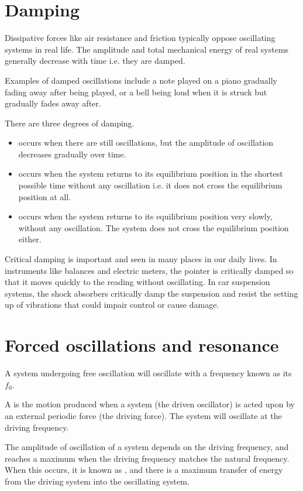 \documentclass[Physics.tex]{subfiles}
\begin{document}
\section{Damping}
Dissipative forces like air resistance and friction typically oppose oscillating systems in real life. The amplitude and total mechanical energy of real systems generally decrease with time i.e. they are damped.

Examples of damped oscillations include a note played on a piano gradually fading away after being played, or a bell being loud when it is struck but gradually fades away after.

There are three degrees of damping. \begin{itemize}
\item {} occurs when there are still oscillations, but the amplitude of oscillation decreases gradually over time.
\item {} occurs when the system returns to its equilibrium position in the shortest possible time without any oscillation i.e. it does not cross the equilibrium position at all.
\item {} occurs when the system returns to its equilibrium position very slowly, without any oscillation. The system does not cross the equilibrium position either.\end{itemize}

Critical damping is important and seen in many places in our daily lives. In instruments like balances and electric meters, the pointer is critically damped so that it moves quickly to the reading without oscillating. In car suspension systems, the shock absorbers critically damp the suspension and resist the setting up of vibrations that could impair control or cause damage.
\section{Forced oscillations and resonance}
A system undergoing free oscillation will oscillate with a frequency known as its  \(f_0\).

A  is the motion produced when a system (the driven oscillator) is acted upon by an external periodic force (the driving force). The system will oscillate at the driving frequency.

The amplitude of oscillation of a system depends on the driving frequency, and reaches a maximum when the driving frequency matches the natural frequency. When this occurs, it is known as , and there is a maximum transfer of energy from the driving system into the oscillating system.
\end{document}
